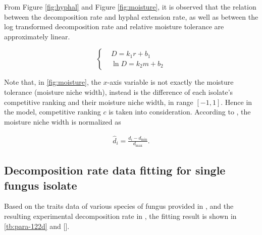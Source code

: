 From Figure \ref{fig:hyphal} and Figure \ref{fig:moisture}, it is observed that the relation between the decomposition rate and hyphal extension rate, as well as between the log transformed decomposition rate and relative moisture tolerance are approximately linear.

\begin{equation}\label{eq:decay-ability}
    \left\{\begin{aligned}
         & D = k_1r + b_1     \\
         & \ln D = k_2m + b_2
    \end{aligned}\right.
\end{equation}



Note that, in \ref{fig:moisture}, the $x$-axis variable is not exactly the moisture tolerance (moisture niche width), instead is the difference of each isolate’s competitive ranking and their moisture niche width, in range $[-1, 1]$. Hence in the model, competitive ranking $c$ is taken into consideration. According to \cite{Maynard-data}, the moisture niche width is normalized as

\begin{equation}
    \begin{aligned}
        \hat{d}_i =
        \frac{d_i - d_\text{min}}{d_\text{max}}.
    \end{aligned}
\end{equation}


\subsection{Decomposition rate data fitting for single fungus isolate}

Based on the traits data of various species of fungus provided in \cite{Maynard-data}, and the resulting experimental decomposition rate in \cite{Lustenshouwer}, the fitting result is shown in \ref{tb:para-122d} and [].

